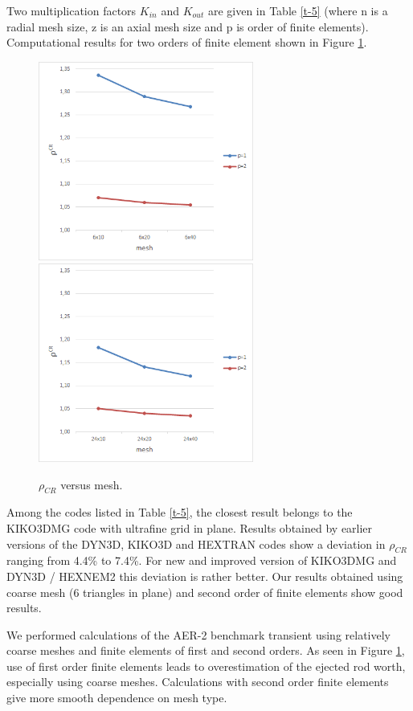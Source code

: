 \documentclass{aip-cp}
\begin{document}
Two multiplication factors $K_{in}$ and $K_{out}$ are given in Table \ref{t-5} (where n is a radial mesh size, z is an axial mesh size and p is order of finite elements). Computational results for two orders of finite element shown in Figure \ref{fig:3}.

\begin{figure}[!h]
  \includegraphics[width=200pt]{ro1.png}
  \includegraphics[width=200pt]{ro2.png}
  \caption{$\rho_{CR}$ versus mesh.}
  \label{fig:3}
\end{figure}

Among the codes listed in Table \ref{t-5}, the closest result belongs to the KIKO3DMG code \cite{pataki} with ultrafine grid in plane. Results obtained by earlier versions of the DYN3D, KIKO3D and HEXTRAN codes show a deviation in $\rho_{CR}$ ranging from 4.4\% to 7.4\%. For new and improved version of KIKO3DMG and DYN3D / HEXNEM2 this deviation is rather better. Our results obtained using coarse mesh (6 triangles in plane) and second order of finite elements show good results.

We performed calculations of the AER-2 benchmark transient using relatively coarse meshes and finite elements of first and second orders. As seen in Figure \ref{fig:3}, use of first order finite elements leads to overestimation of the ejected rod worth, especially using coarse meshes. Calculations with second order finite elements give more smooth dependence on mesh type. 
\end{document}
